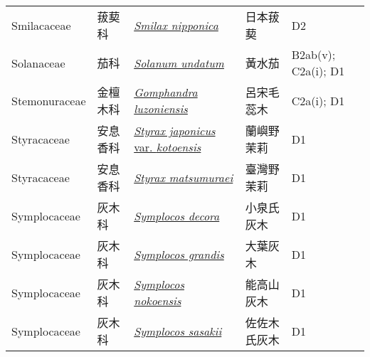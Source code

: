 {\begin{longtable}{L{2.5cm}L{2cm}L{5cm}L{2.5cm}L{3cm}}
    Smilacaceae & 菝葜科 & \href{http://www.theplantlist.org/tpl1.1/search?q=Smilax+nipponica}{\textit{Smilax nipponica} } & 日本菝葜 & D2    \\
    Solanaceae & 茄科 & \href{http://www.theplantlist.org/tpl1.1/search?q=Solanum+undatum}{\textit{Solanum undatum} } & 黃水茄 & B2ab(v); C2a(i); D1    \\
    Stemonuraceae & 金檀木科 & \href{http://www.theplantlist.org/tpl1.1/search?q=Gomphandra+luzoniensis}{\textit{Gomphandra luzoniensis} } & 呂宋毛蕊木 & C2a(i); D1    \\
    Styracaceae & 安息香科 & \href{http://www.theplantlist.org/tpl1.1/search?q=Styrax+japonicus+var.+kotoensis}{\textit{Styrax japonicus} var. \textit{kotoensis} } & 蘭嶼野茉莉 & D1    \\
    Styracaceae & 安息香科 & \href{http://www.theplantlist.org/tpl1.1/search?q=Styrax+matsumuraei}{\textit{Styrax matsumuraei} } & 臺灣野茉莉 & D1    \\
    Symplocaceae & 灰木科 & \href{http://www.theplantlist.org/tpl1.1/search?q=Symplocos+decora}{\textit{Symplocos decora} } & 小泉氏灰木 & D1    \\
    Symplocaceae & 灰木科 & \href{http://www.theplantlist.org/tpl1.1/search?q=Symplocos+grandis}{\textit{Symplocos grandis} } & 大葉灰木 & D1    \\
    Symplocaceae & 灰木科 & \href{http://www.theplantlist.org/tpl1.1/search?q=Symplocos+nokoensis}{\textit{Symplocos nokoensis} } & 能高山灰木 & D1    \\
    Symplocaceae & 灰木科 & \href{http://www.theplantlist.org/tpl1.1/search?q=Symplocos+sasakii}{\textit{Symplocos sasakii} } & 佐佐木氏灰木 & D1    \\

\end{longtable}}
